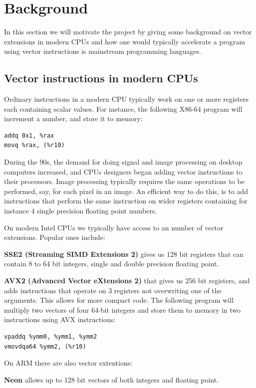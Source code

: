 \documentclass{article}
\begin{document}
\section{Background}

In this section we will motivate the project by giving some background on vector extensions in modern CPUs and how one would typically accelerate a program using vector instructions is mainstream programming languages.

\subsection{Vector instructions in modern CPUs}

Ordinary instructions in a modern CPU typically work on one or more registers each containing scalar values. For instance, the following X86-64 program will increment a number, and store it to memory:
\begin{verbatim}
addq 0x1, %rax
movq %rax, (%r10)
\end{verbatim}

During the 90s, the demand for doing signal and image processing on desktop computers increased, and CPUs designers began adding vector instructions to their processors. Image processing typically requires the same operations to be performed, say, for each pixel in an image. An efficient way to do this, is to add instructions that perform the same instruction on wider registers containing for instance 4 single precision floating point numbers.

On modern Intel CPUs we typically have access to an number of vector extensions. Popular ones include:

\textbf{SSE2 (Streaming SIMD Extensions 2)} gives us 128 bit registers that can contain 8 to 64 bit integers, single and double precision floating point.

\textbf{AVX2 (Advanced Vector eXtensions 2)}
that gives us 256 bit registers, and adds instructions that operate on 3 registers not overwriting one of the arguments. This allows for more compact code. The following program will multiply two vectors of four 64-bit integers and store them to memory in two instructions using AVX instructions:
\begin{verbatim}
vpaddq %ymm0, %ymm1, %ymm2
vmovdqa64 %ymm2, (%r10)
\end{verbatim}

On ARM there are also vector extentions:

\textbf{Neon}
allows up to 128 bit vectors of both integers and floating point.
\end{document}
